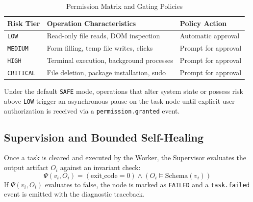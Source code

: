 \documentclass[conference]{IEEEtran}
\begin{document}
\begin{table}[htbp]
\caption{Permission Matrix and Gating Policies}
\label{tab:permission_policies}
\centering
\begin{tabular}{p{1.5cm} p{3.8cm} p{2.2cm}}
\toprule
\textbf{Risk Tier} & \textbf{Operation Characteristics} & \textbf{Policy Action} \\
\midrule
\texttt{LOW} & Read-only file reads, DOM inspection & Automatic approval \\
\texttt{MEDIUM} & Form filling, temp file writes, clicks & Prompt for approval \\
\texttt{HIGH} & Terminal execution, background processes & Prompt for approval \\
\texttt{CRITICAL} & File deletion, package installation, sudo & Prompt for approval \\
\bottomrule
\end{tabular}
\end{table}

Under the default \texttt{SAFE} mode, operations that alter system state or possess risk above \texttt{LOW} trigger an asynchronous pause on the task node until explicit user authorization is received via a \texttt{permission.granted} event.

\subsection{Supervision and Bounded Self-Healing}
Once a task is cleared and executed by the Worker, the Supervisor evaluates the output artifact $O_i$ against an invariant check:
\begin{equation}
\Psi(v_i, O_i) = (\text{exit\_code} = 0) \land (O_i \models \text{Schema}(v_i))
\end{equation}
If $\Psi(v_i, O_i)$ evaluates to false, the node is marked as \texttt{FAILED} and a \texttt{task.failed} event is emitted with the diagnostic traceback.
\end{document}
